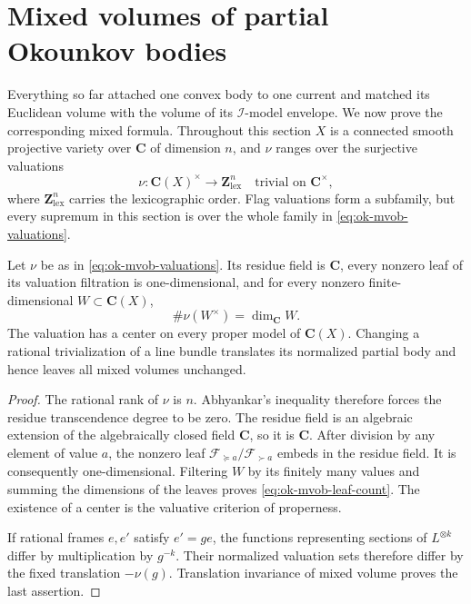 \section{Mixed volumes of partial Okounkov bodies}
\label{sec:ok-mixed-volumes}

Everything so far attached one convex body to one current and matched its
Euclidean volume with the volume of its \(\mathcal I\)-model envelope.  We
now prove the corresponding mixed formula.  Throughout this section \(X\)
is a connected smooth projective variety over \(\mathbf C\) of dimension
\(n\), and \(\nu\) ranges over the surjective valuations
\[
 \nu:\mathbf C(X)^\times\longrightarrow\mathbf Z^n_{\mathrm{lex}}
 \quad\text{trivial on }\mathbf C^\times ,
\tag{55.26}\label{eq:ok-mvob-valuations}
\]
where \(\mathbf Z^n_{\mathrm{lex}}\) carries the lexicographic order.  Flag
valuations form a subfamily, but every supremum in this section is over the
whole family in \eqref{eq:ok-mvob-valuations}.

\begin{lemma}\label{lem:ok-mvob-valuative-leaves}
Let \(\nu\) be as in \eqref{eq:ok-mvob-valuations}.  Its residue field is
\(\mathbf C\), every nonzero leaf of its valuation filtration is
one-dimensional, and for every nonzero finite-dimensional
\(W\subset\mathbf C(X)\),
\[
                         \#\nu(W^\times)=\dim_{\mathbf C}W.
\tag{55.27}\label{eq:ok-mvob-leaf-count}
\]
The valuation has a center on every proper model of \(\mathbf C(X)\).
Changing a rational trivialization of a line bundle translates its
normalized partial body and hence leaves all mixed volumes unchanged.
\end{lemma}

\begin{proof}
The rational rank of \(\nu\) is \(n\).  Abhyankar's inequality therefore
forces the residue transcendence degree to be zero.  The residue field is
an algebraic extension of the algebraically closed field \(\mathbf C\), so
it is \(\mathbf C\).  After division by any element of value \(a\), the
nonzero leaf
\(\mathcal F_{\succeq a}/\mathcal F_{\succ a}\) embeds in the residue
field.  It is consequently one-dimensional.
Filtering \(W\) by its finitely many values and summing the dimensions of
the leaves proves \eqref{eq:ok-mvob-leaf-count}.  The existence of a center
is the valuative criterion of properness.

If rational frames \(e,e'\) satisfy \(e'=ge\), the functions representing
sections of \(L^{\otimes k}\) differ by multiplication by \(g^{-k}\).
Their normalized valuation sets therefore differ by the fixed translation
\(-\nu(g)\).  Translation invariance of mixed volume proves the last
assertion.
\end{proof}

